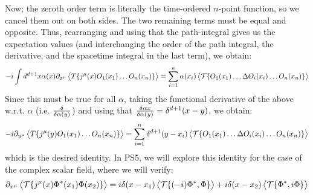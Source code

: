 Now; the zeroth order term is literally the time-ordered $n$-point function, so we cancel them out on both sides. The two remaining terms must be equal and opposite. Thus, rearranging and using that the path-integral gives us the expectation values (and interchanging the order of the path integral, the derivative, and the spacetime integral in the last term), we obtain:
\begin{equation}
    -i\int d^{d+1}x \alpha(x) \partial_{x^\mu}\left< T\{j^\mu(x)O_1(x_1)\ldots O_n(x_n)\} \right> = \sum_{i=1}^n \alpha(x_i)\left< \mathcal{T}\{O_1(x_1)\ldots \Delta O_i(x_i)\ldots O_n(x_n)\} \right>
\end{equation}
Since this must be true for all $\alpha$, taking the functional derivative of the above w.r.t. $\alpha$ (i.e. $\frac{\delta }{\delta \alpha(y)}$) and using that $\frac{\delta \alpha{x}}{\delta \alpha(y)} = \delta^{d+1}(x-y)$, we obtain:
\begin{equation}
    -i\partial_{y^\mu}\left< T\{j^\mu(y)O_1(x_1)\ldots O_n(x_n)\} \right> = \sum_{i=1}^n \delta^{d+1}(y - x_i)\left< \mathcal{T}\{O_1(x_1)\ldots \Delta O_i(x_i)\ldots O_n(x_n)\} \right>
\end{equation}
which is the desired identity. In PS5, we will explore this identity for the case of the complex scalar field, where we will verify:
\begin{equation}
    \partial_{x^\mu}\left< \mathcal{T}\{j^\mu(x)\Phi^*(x_1)\Phi(x_2)\} \right> = i\delta(x - x_1)\left< \mathcal{T}\{(-i)\Phi^*,\Phi\} \right> + i\delta(x - x_2)\left< \mathcal{T}\{\Phi^*,i\Phi\} \right>
\end{equation}